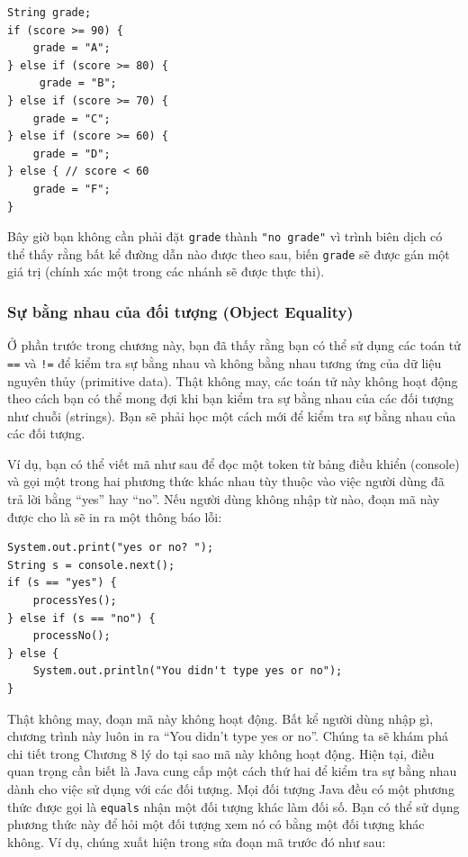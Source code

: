 \begin{verbatim}
String grade;
if (score >= 90) {
    grade = "A";
} else if (score >= 80) {
     grade = "B";
} else if (score >= 70) {
    grade = "C";
} else if (score >= 60) {
    grade = "D";
} else { // score < 60
    grade = "F";
}
\end{verbatim}

Bây giờ bạn không cần phải đặt \texttt{grade} thành \texttt{"no\ grade"}
vì trình biên dịch có thể thấy rằng bất kể đường dẫn nào được theo sau,
biến \texttt{grade} sẽ được gán một giá trị (chính xác một trong các
nhánh sẽ được thực thi).

\subsubsection{Sự bằng nhau của đối tượng (Object
Equality)}\label{sux1ef1-bux1eb1ng-nhau-cux1ee7a-ux111ux1ed1i-tux1b0ux1ee3ng-object-equality}

Ở phần trước trong chương này, bạn đã thấy rằng bạn có thể sử dụng các
toán tử \texttt{==} và \texttt{!=} để kiểm tra sự bằng nhau và không
bằng nhau tương ứng của dữ liệu nguyên thủy (primitive data). Thật không
may, các toán tử này không hoạt động theo cách bạn có thể mong đợi khi
bạn kiểm tra sự bằng nhau của các đối tượng như chuỗi (strings). Bạn sẽ
phải học một cách mới để kiểm tra sự bằng nhau của các đối tượng.

Ví dụ, bạn có thể viết mã như sau để đọc một token từ bảng điều khiển
(console) và gọi một trong hai phương thức khác nhau tùy thuộc vào việc
người dùng đã trả lời bằng ``yes'' hay ``no''. Nếu người dùng không nhập
từ nào, đoạn mã này được cho là sẽ in ra một thông báo lỗi:

\begin{verbatim}
System.out.print("yes or no? ");
String s = console.next();
if (s == "yes") {
    processYes();
} else if (s == "no") {
    processNo();
} else {
    System.out.println("You didn't type yes or no");
}
\end{verbatim}

Thật không may, đoạn mã này không hoạt động. Bất kể người dùng nhập gì,
chương trình này luôn in ra ``You didn't type yes or no''. Chúng ta sẽ
khám phá chi tiết trong Chương 8 lý do tại sao mã này không hoạt động.
Hiện tại, điều quan trọng cần biết là Java cung cấp một cách thứ hai để
kiểm tra sự bằng nhau dành cho việc sử dụng với các đối tượng. Mọi đối
tượng Java đều có một phương thức được gọi là \texttt{equals} nhận một
đối tượng khác làm đối số. Bạn có thể sử dụng phương thức này để hỏi một
đối tượng xem nó có bằng một đối tượng khác không. Ví dụ, chúng xuất
hiện trong sửa đoạn mã trước đó như sau:

